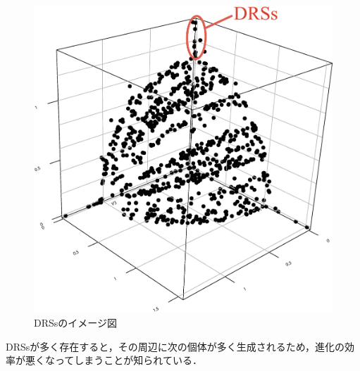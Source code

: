 \documentclass[../main/main]{subfiles}
\begin{document}
\begin{description}
\begin{description}
\begin{figure}[htbp]
\begin{center}
\includegraphics[width=0.7\linewidth]{../figures/DRSs.eps}
\end{center}
\setlength{\abovecaptionskip}{0mm}
\setlength{\belowcaptionskip}{0mm}
\caption{DRSsのイメージ図}
\label{drs}
\end{figure}

DRSsが多く存在すると，その周辺に次の個体が多く生成されるため，進化の効率が悪くなってしまうことが知られている．
\end{description}
%
\end{description}
\end{document}
